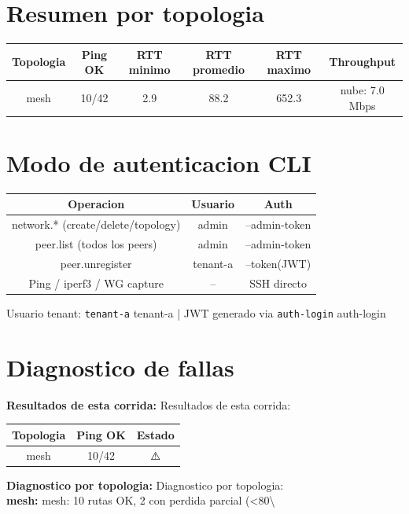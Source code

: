\documentclass[11pt,a4paper]{article}
\begin{document}
\section{Resumen por topologia}
\begin{longtable}{|c|c|c|c|c|c|}
\hline
Topologia & Ping OK & RTT minimo & RTT promedio & RTT maximo & Throughput \\ \hline
mesh & 10/42 & 2.9 & 88.2 & 652.3 & nube: 7.0 Mbps \\ \hline
\end{longtable}

\section{Modo de autenticacion CLI}
\begin{longtable}{|c|c|c|}
\hline
Operacion & Usuario & Auth \\ \hline
network.* (create/delete/topology) & admin & --admin-token \\ \hline
peer.list (todos los peers) & admin & --admin-token \\ \hline
peer.unregister & tenant-a & --token(JWT) \\ \hline
Ping / iperf3 / WG capture & -- & SSH directo \\ \hline
\end{longtable}

Usuario tenant:  \texttt{tenant-a} tenant-a  | JWT generado via  \texttt{auth-login} auth-login\\

\section{Diagnostico de fallas}
\textbf{Resultados de esta corrida:} Resultados de esta corrida:\\

\begin{longtable}{|c|c|c|}
\hline
Topologia & Ping OK & Estado \\ \hline
mesh & 10/42 & ⚠️ \\ \hline
\end{longtable}

\textbf{Diagnostico por topologia:} Diagnostico por topologia:\\

\textbf{mesh:} mesh:  10 rutas OK, 2 con perdida parcial (<80\textbackslash{}%
\end{document}
